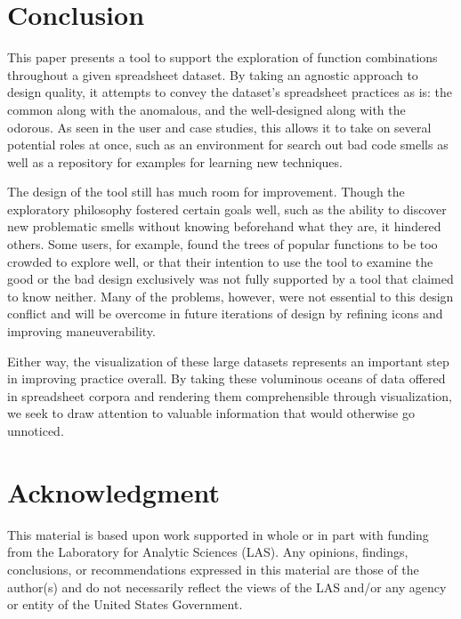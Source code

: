 \documentclass[conference]{IEEEtran}
\begin{document}
	
	
	
	\section{Conclusion} This paper presents a tool to support the exploration of
	function combinations throughout a given spreadsheet dataset. By taking an
	agnostic approach to design quality, it attempts to convey the dataset's
	spreadsheet practices as is: the common along with the anomalous, and the
	well-designed along with the odorous. As seen in the user and case studies,
	this allows it to take on several potential roles at once, such as an
	environment for search out bad code smells as well as a repository for examples
	for learning new techniques. \par
	
	The design of the tool still has much room for improvement. Though the
	exploratory philosophy fostered certain goals well, such as the ability to
	discover new problematic smells without knowing beforehand what they are, it
	hindered others. Some users, for example, found the trees of popular functions
	to be too crowded to explore well, or that their intention to use the tool to
	examine the good or the bad design exclusively was not fully supported by a
	tool that claimed to know neither. Many of the problems, however, were not
	essential to this design conflict and will be overcome in future iterations of
	design by refining icons and improving maneuverability. \par
	
	Either way, the visualization of these large datasets represents an important
	step in improving practice overall. By taking these voluminous oceans of data
	offered in spreadsheet corpora and rendering them comprehensible through
	visualization, we seek to draw attention to valuable information that would otherwise
	go unnoticed.
	
	\section*{Acknowledgment} This material is based upon work supported in whole
	or in part with funding from the Laboratory for Analytic Sciences (LAS). Any
	opinions, findings, conclusions, or recommendations expressed in this material
	are those of the author(s) and do not necessarily reflect the views of the LAS
	and/or any agency or entity of the United States Government.
	
\end{document}
